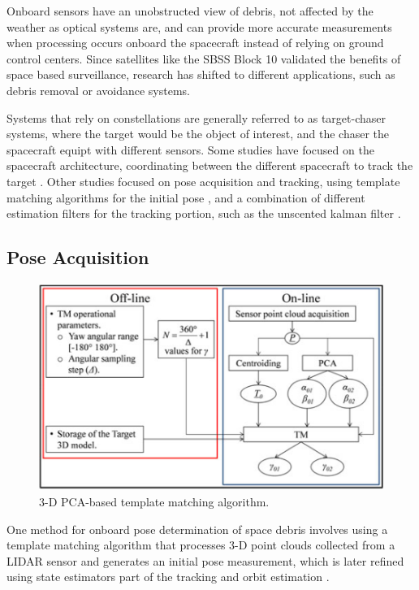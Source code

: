 \documentclass[conference]{IEEEtran}
\begin{document}
		Onboard sensors have an unobstructed view of debris, not affected by the weather as optical systems are, and can provide more accurate measurements when processing occurs onboard the spacecraft instead of relying on ground control centers. Since satellites like the SBSS Block 10 validated the benefits of space based surveillance, research has shifted to different applications, such as debris removal or avoidance systems.
		
		Systems that rely on constellations are generally referred to as target-chaser systems, where the target would be the object of interest, and the chaser the spacecraft equipt with different sensors. Some studies have focused on the spacecraft architecture, coordinating between the different spacecraft to track the target \cite{multi_spacecraft_2016}. Other studies focused on pose acquisition and tracking, using template matching algorithms for the initial pose \cite{2017_pose_pca}\cite{OpromollaRoberto2015Upew}, and a combination of different estimation filters for the tracking portion, such as the unscented kalman filter \cite{unscented_kalman}.
		
		
	\subsection{Pose Acquisition}
		\begin{figure}[htbp]
			\centerline{\includegraphics[scale=0.85]{Images/3_D_PCA_based_TM_algorithm.PNG}}
			\caption{3-D PCA-based template matching algorithm.}
			\label{3_D_PCA_based_TM_algorithm}
		\end{figure}
	
		One method for onboard pose determination of space debris involves using a template matching algorithm that processes 3-D point clouds collected from a LIDAR sensor and generates an initial pose measurement, which is later refined using state estimators part of the tracking and orbit estimation \cite{2017_pose_pca}\cite{liu2016point}\cite{unscented_kalman}.
		
\end{document}
